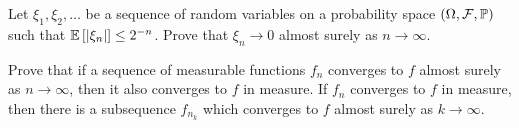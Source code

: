 \begin{problem}{7}
Let $\xi_1,\xi_2,\ldots$ be a sequence of random variables on a probability space $(\Omega, \mathcal{F}, \mathbb{P})$ such that $\mathbb{E}\left[|\xi_n|\right] \leq 2^{-n}$. Prove that $\xi_n \to 0$ almost surely as $n\to\infty$.
\end{problem}
\begin{solution}
     
\end{solution}

\begin{problem}{8}
Prove that if a sequence of measurable functions $f_n$ converges to $f$ almost surely as $n\to\infty$, then it also converges to $f$ in measure. If $f_n$ converges to $f$ in measure, then there is a subsequence $f_{n_k}$ which converges to $f$ almost surely as $k\to\infty$.
\end{problem}
